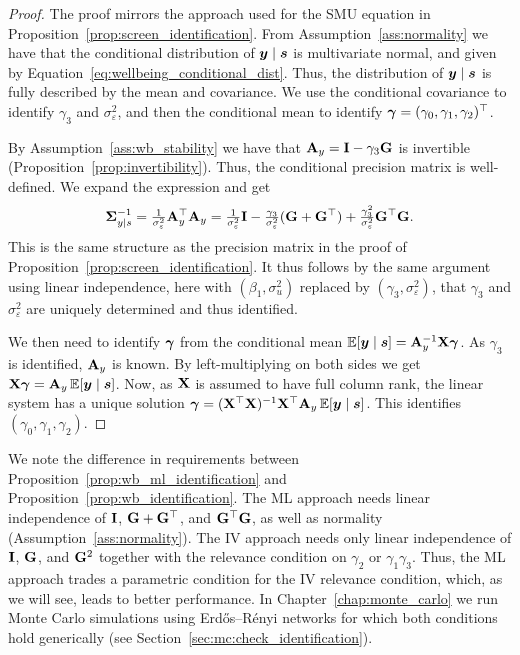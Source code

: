 \begin{proof}
The proof mirrors the approach used for the SMU equation in Proposition~\ref{prop:screen_identification}. From Assumption~\ref{ass:normality} we have that the conditional distribution of $\bm{y} \mid \bm{s}$ is multivariate normal, and given by Equation~\eqref{eq:wellbeing_conditional_dist}. Thus, the distribution of $\bm{y} \mid \bm{s}$ is fully described by the mean and covariance. We use the conditional covariance to identify $\gamma_3$ and $\sigma_\varepsilon^2$, and then the conditional mean to identify $\bm{\gamma} = (\gamma_0, \gamma_1, \gamma_2)^\top$.

By Assumption~\ref{ass:wb_stability} we have that $\mathbf{A}_y = \mathbf{I} - \gamma_3\mathbf{G}$ is invertible (Proposition~\ref{prop:invertibility}). Thus, the conditional precision matrix is well-defined. We expand the expression and get
\[
    \mathbf{\Sigma}_{y \mid s}^{-1}
    = \tfrac{1}{\sigma_\varepsilon^2}\mathbf{A}_y^{\top}\mathbf{A}_y
    = \tfrac{1}{\sigma_\varepsilon^2}\mathbf{I}
    - \tfrac{\gamma_3}{\sigma_\varepsilon^2}(\mathbf{G} + \mathbf{G}^\top)
    + \tfrac{\gamma_3^2}{\sigma_\varepsilon^2}\mathbf{G}^\top\mathbf{G}.
\]
This is the same structure as the precision matrix in the proof of Proposition~\ref{prop:screen_identification}. It thus follows by the same argument using linear independence, here with $(\beta_1, \sigma_u^2)$ replaced by $(\gamma_3, \sigma_\varepsilon^2)$, that $\gamma_3$ and $\sigma_\varepsilon^2$ are uniquely determined and thus identified.

We then need to identify $\bm{\gamma}$ from the conditional mean $\mathbb{E}[\bm{y} \mid \bm{s}] = \mathbf{A}_y^{-1}\mathbf{X}\bm{\gamma}$. As $\gamma_3$ is identified, $\mathbf{A}_y$ is known. By left-multiplying on both sides we get $\mathbf{X}\bm{\gamma} = \mathbf{A}_y\,\mathbb{E}[\bm{y} \mid \bm{s}]$. Now, as $\mathbf{X}$ is assumed to have full column rank, the linear system has a unique solution $\bm{\gamma} = (\mathbf{X}^\top\mathbf{X})^{-1}\mathbf{X}^\top\mathbf{A}_y\,\mathbb{E}[\bm{y} \mid \bm{s}]$. This identifies $(\gamma_0, \gamma_1, \gamma_2)$.
\end{proof}

We note the difference in requirements between Proposition~\ref{prop:wb_ml_identification} and Proposition~\ref{prop:wb_identification}. The ML approach needs linear independence of $\mathbf{I}$, $\mathbf{G} + \mathbf{G}^\top$, and $\mathbf{G}^\top\mathbf{G}$, as well as normality (Assumption~\ref{ass:normality}). The IV approach needs only linear independence of $\mathbf{I}$, $\mathbf{G}$, and $\mathbf{G}^2$ together with the relevance condition on $\gamma_2$ or $\gamma_1\gamma_3$. Thus, the ML approach trades a parametric condition for the IV relevance condition, which, as we will see, leads to better performance. In Chapter~\ref{chap:monte_carlo} we run Monte Carlo simulations using Erd\H{o}s--R\'enyi networks for which both conditions hold generically (see Section~\ref{sec:mc:check_identification}).

